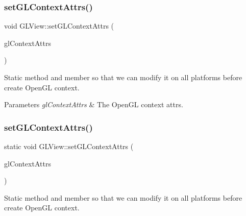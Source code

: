 \mbox{\label{classGLView_abf100389994d936ad6bf9f32966bb7cf}} 
\subsubsection{\texorpdfstring{set\+G\+L\+Context\+Attrs()}{setGLContextAttrs()}\hspace{0.1cm}{\footnotesize\ttfamily [1/2]}}
{\footnotesize\ttfamily void G\+L\+View\+::set\+G\+L\+Context\+Attrs (\begin{DoxyParamCaption}\item[{\hyperlink{structGLContextAttrs}{G\+L\+Context\+Attrs} \&}]{gl\+Context\+Attrs }\end{DoxyParamCaption})\hspace{0.3cm}{\ttfamily [static]}}

Static method and member so that we can modify it on all platforms before create Open\+GL context.


\begin{DoxyParams}{Parameters}
{\em gl\+Context\+Attrs} & The Open\+GL context attrs. \\
\hline
\end{DoxyParams}
\mbox{\label{classGLView_a67b7c433b4bb6578948ca06ac01d1e38}} 
\subsubsection{\texorpdfstring{set\+G\+L\+Context\+Attrs()}{setGLContextAttrs()}\hspace{0.1cm}{\footnotesize\ttfamily [2/2]}}
{\footnotesize\ttfamily static void G\+L\+View\+::set\+G\+L\+Context\+Attrs (\begin{DoxyParamCaption}\item[{\hyperlink{structGLContextAttrs}{G\+L\+Context\+Attrs} \&}]{gl\+Context\+Attrs }\end{DoxyParamCaption})\hspace{0.3cm}{\ttfamily [static]}}

Static method and member so that we can modify it on all platforms before create Open\+GL context.


